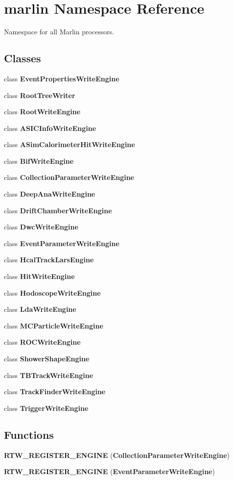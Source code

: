 \section{marlin Namespace Reference}
\label{namespacemarlin}


Namespace for all Marlin processors.  


\subsection*{Classes}
\begin{DoxyCompactItemize}
\item 
class {\bf Event\-Properties\-Write\-Engine}
\item 
class {\bf Root\-Tree\-Writer}
\item 
class {\bf Root\-Write\-Engine}
\item 
class {\bf A\-S\-I\-C\-Info\-Write\-Engine}
\item 
class {\bf A\-Sim\-Calorimeter\-Hit\-Write\-Engine}
\item 
class {\bf Bif\-Write\-Engine}
\item 
class {\bf Collection\-Parameter\-Write\-Engine}
\item 
class {\bf Deep\-Ana\-Write\-Engine}
\item 
class {\bf Drift\-Chamber\-Write\-Engine}
\item 
class {\bf Dwc\-Write\-Engine}
\item 
class {\bf Event\-Parameter\-Write\-Engine}
\item 
class {\bf Hcal\-Track\-Lars\-Engine}
\item 
class {\bf Hit\-Write\-Engine}
\item 
class {\bf Hodoscope\-Write\-Engine}
\item 
class {\bf Lda\-Write\-Engine}
\item 
class {\bf M\-C\-Particle\-Write\-Engine}
\item 
class {\bf R\-O\-C\-Write\-Engine}
\item 
class {\bf Shower\-Shape\-Engine}
\item 
class {\bf T\-B\-Track\-Write\-Engine}
\item 
class {\bf Track\-Finder\-Write\-Engine}
\item 
class {\bf Trigger\-Write\-Engine}
\end{DoxyCompactItemize}
\subsection*{Functions}
\begin{DoxyCompactItemize}
\item 
{\bfseries R\-T\-W\-\_\-\-R\-E\-G\-I\-S\-T\-E\-R\-\_\-\-E\-N\-G\-I\-N\-E} ({\bf Collection\-Parameter\-Write\-Engine})\label{namespacemarlin_a14315d6fe618896a72ced2114cd7bedd}

\item 
{\bfseries R\-T\-W\-\_\-\-R\-E\-G\-I\-S\-T\-E\-R\-\_\-\-E\-N\-G\-I\-N\-E} ({\bf Event\-Parameter\-Write\-Engine})\label{namespacemarlin_a7c82289cb953414fdfde7267cf6b07e7}

\end{DoxyCompactItemize}
